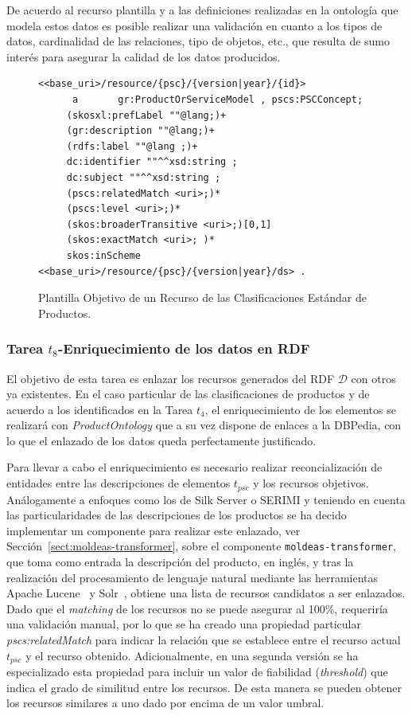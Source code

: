 De acuerdo al recurso plantilla y a las definiciones realizadas en la ontología que modela estos datos 
es posible realizar una validación en cuanto a los tipos de datos, cardinalidad de las relaciones, tipo de objetos, etc., que 
resulta de sumo interés para asegurar la calidad de los datos producidos.

\begin{figure}[!htp]
\begin{lstlisting} 
<<base_uri>/resource/{psc}/{version|year}/{id}>
      a       gr:ProductOrServiceModel , pscs:PSCConcept;
     (skosxl:prefLabel ""@lang;)+
     (gr:description ""@lang;)+
     (rdfs:label ""@lang ;)+
     dc:identifier ""^^xsd:string ;
     dc:subject ""^^xsd:string ;
     (pscs:relatedMatch <uri>;)*
     (pscs:level <uri>;)*
     (skos:broaderTransitive <uri>;)[0,1]
     (skos:exactMatch <uri>; )*
     skos:inScheme <<base_uri>/resource/{psc}/{version|year}/ds> .	
\end{lstlisting}
	\caption{Plantilla Objetivo de un Recurso de las Clasificaciones Estándar de Productos.}
	\label{fig:pscs-template}
\end{figure}



\subsubsection{Tarea $t_8$-Enriquecimiento de los datos en RDF}\label{t8-pscs}
El objetivo de esta tarea es enlazar los recursos generados del \dataset RDF $\mathcal{D}$ con otros 
ya existentes. En el caso particular de las clasificaciones de productos y de acuerdo a los \datasets 
identificados en la Tarea $t_4$, el enriquecimiento de los elementos se realizará con \textit{ProductOntology} que 
a su vez dispone de enlaces a la DBPedia, con lo que el enlazado de los datos queda perfectamente justificado. 

Para llevar a cabo el enriquecimiento es necesario realizar reconcialización de entidades entre las descripciones 
de elementos $t_{psc}$ y los recursos objetivos. Análogamente a enfoques como los de Silk Server o SERIMI y teniendo 
en cuenta las particularidades de las descripciones de los productos se ha decido implementar un componente 
para realizar este enlazado, ver Sección~\ref{sect:moldeas-transformer}, sobre el componente \texttt{moldeas-transformer}, que toma como entrada la descripción del producto, en inglés, y tras 
la realización del procesamiento de lenguaje natural mediante las herramientas Apache \gls{Lucene}~\cite{Hatcher:2004:LA:1044938} y \gls{Solr}~\cite{solr}, obtiene una lista de recursos 
candidatos a ser enlazados. Dado que el \textit{matching} de los recursos no se puede asegurar al 100\%, requeriría una validación manual, 
por lo que se ha creado una propiedad particular \textit{pscs:relatedMatch} para indicar la relación que se establece entre el recurso 
actual $t_{psc}$ y el recurso obtenido. Adicionalmente, en una segunda versión se ha especializado esta propiedad para incluir 
un valor de fiabilidad (\textit{threshold}) que indica el grado de similitud entre los recursos. De esta manera se pueden obtener 
los recursos similares a uno dado por encima de un valor umbral.

